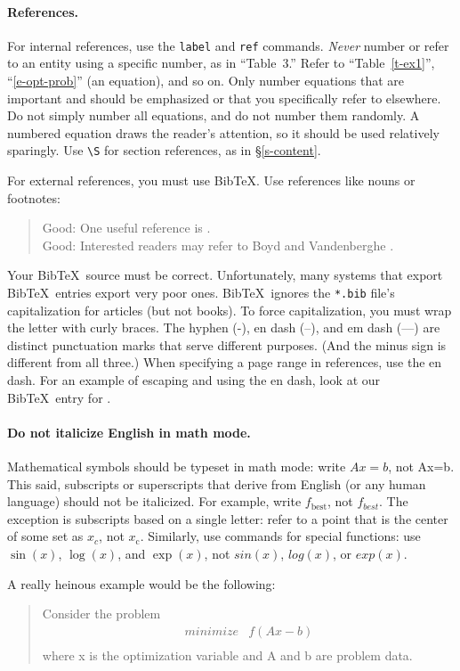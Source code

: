 \documentclass[12pt]{article}
\begin{document}
\paragraph{References.}
For internal references, use the \texttt{label} and \texttt{ref} commands.
\emph{Never} number or refer to an entity using a specific number,
as in ``Table~3.''
Refer to ``Table~\ref{t-ex1}'', ``\eqref{e-opt-prob}'' (an equation), and so on.
Only number equations that are important and should be emphasized or that you
specifically refer to elsewhere. Do not simply number all equations, and do not
number them randomly. A numbered equation draws the reader's attention, so it
should be used relatively sparingly. Use \verb+\S+ for section references, as in
\S\ref{s-content}.

For external references, you must use Bib\TeX. Use references like nouns or 
footnotes:
\begin{quote}
Good: One useful reference is \cite{BoV:04}. \\
Good: Interested readers may refer to Boyd and Vandenberghe \cite{BoV:04}.
\end{quote}

Your Bib\TeX\ source must be correct.  Unfortunately, many systems that export
Bib\TeX\ entries export very poor ones.  Bib\TeX\ ignores the \texttt{*.bib}
file's capitalization for articles (but not books). To force capitalization,
you must wrap the letter with curly braces.  The hyphen (-), en dash (--), and
em dash (---) are distinct punctuation marks that serve different purposes.
(And the minus sign is different from all three.) When specifying a page range
in references, use the en dash. For an example of escaping and using the en
dash, look at our Bib\TeX\ entry for \cite{Tref:2008}.

\paragraph{Do not italicize English in math mode.}
Mathematical symbols should be typeset in math mode:
write $Ax=b$, not Ax=b. This said, subscripts or
superscripts that derive from English (or any human language) should not be
italicized. For example, write $f_\mathrm{best}$, not $f_{best}$. The exception
is subscripts based on a single letter: refer
to a point that is the center of some set as $x_c$, not $x_{\mathrm{c}}$.
Similarly, use commands for special functions: use $\sin(x)$,
$\log(x)$, and $\exp(x)$, not $sin(x)$, $log(x)$, or $exp(x)$.

A really heinous example would be the following:
\begin{quote}
Consider the problem
\[
\begin{array}{ll}
minimize & f(Ax - b) \\
\end{array}
\]
where x is the optimization variable and A and b are problem data.
\end{quote}
\end{document}
